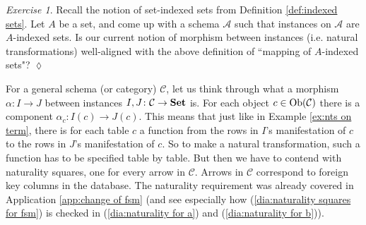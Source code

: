 \documentclass{book}
\def\tn{\textnormal}
\def\mc{\mathcal}
\def\Ob{\tn{Ob}}
\def\to{\rightarrow}
\def\taking{\colon}
\def\Set{{\bf Set}}
\def\mcA{\mc{A}}
\def\mcC{\mc{C}}
\theoremstyle{remark}
\newtheorem{exc}[subsubsection]{Exercise}
\newenvironment{exercise}{\begin{exc}}{\hspace*{\fill}$\lozenge$\end{exc}}
\theoremstyle{definition}
\begin{document}
\begin{exercise}\label{exc:indexed sets as functors}
Recall the notion of set-indexed sets from Definition \ref{def:indexed sets}. Let $A$ be a set, and come up with a schema $\mcA$ such that instances on $\mcA$ are $A$-indexed sets. Is our current notion of morphism between instances (i.e. natural transformations) well-aligned with the above definition of ``mapping of $A$-indexed sets"?
\end{exercise}

For a general schema (or category) $\mcC$, let us think through what a morphism $\alpha\taking I\to J$ between instances $I,J\taking\mcC\to\Set$ is. For each object $c\in\Ob(\mcC)$ there is a component $\alpha_c\taking I(c)\to J(c)$. This means that just like in Example \ref{ex:nts on term}, there is for each table $c$ a function from the rows in $I$'s manifestation of $c$ to the rows in $J$'s manifestation of $c$. So to make a natural transformation, such a function has to be specified table by table. But then we have to contend with naturality squares, one for every arrow in $\mcC$. Arrows in $\mcC$ correspond to foreign key columns in the database. The naturality requirement was already covered in Application \ref{app:change of fsm} (and see especially how (\ref{dia:naturality squares for fsm}) is checked in (\ref{dia:naturality for a}) and (\ref{dia:naturality for b})).
\end{document}
